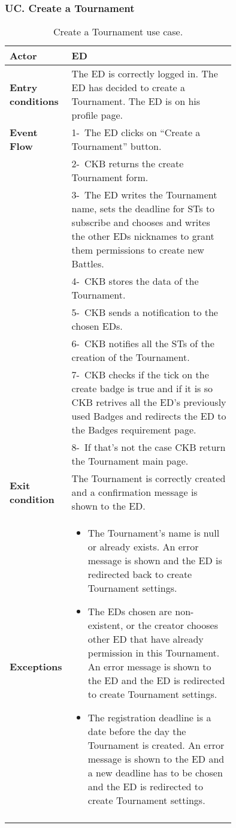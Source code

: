 \subsubsection*{UC\cuc . Create a Tournament}
\begin{center}
    \begin{longtable}{|l|p{0.75\linewidth}|}
        \hline
        \textbf{Actor}            & ED\\
        \hline
        \textbf{Entry conditions} & The ED is correctly logged in. The ED has decided to create a Tournament. The ED is on his profile page. \\
        \hline
        \textbf{Event Flow}       & 1-\ The ED clicks on “Create a Tournament” button.       \\
        & 2-\ CKB returns the create Tournament form.   \\
        & 3-\ The ED writes the Tournament name, sets the deadline for STs to subscribe and chooses and writes the other EDs nicknames to grant them permissions to create new Battles.        \\
        & 4-\ CKB stores the data of the Tournament.        \\
        & 5-\ CKB sends a notification to the chosen EDs.        \\
        & 6-\ CKB notifies all the STs of the creation of the Tournament.        \\
        & 7-\ CKB checks if the tick on the create badge is true and if it is so CKB retrives all the ED's previously used Badges and redirects the ED to the Badges requirement page.\\
        & 8-\ If that's not the case CKB return the Tournament main page. \\
        \hline
        \textbf{Exit condition}   & The Tournament is correctly created and a confirmation message is shown to the ED.        \\
        \hline
        \textbf{Exceptions}        & \begin{itemize}
            \item The Tournament’s name is null or already exists. An error message is shown and the ED is redirected back to create Tournament settings.
            \item The EDs chosen are non-existent, or the creator chooses other ED that have already permission in this Tournament. An error message is shown to the ED and the ED is redirected to create Tournament settings.
            \item The registration deadline is a date before the day the Tournament is created. An error message is shown to the ED and a new deadline has to be chosen and the ED  is redirected to create Tournament settings.
         \end{itemize}    \\
        \hline
        \caption{Create a Tournament use case.}
        \label{tab: create_a_Tournament_use_case}
    \end{longtable}
\end{center}

